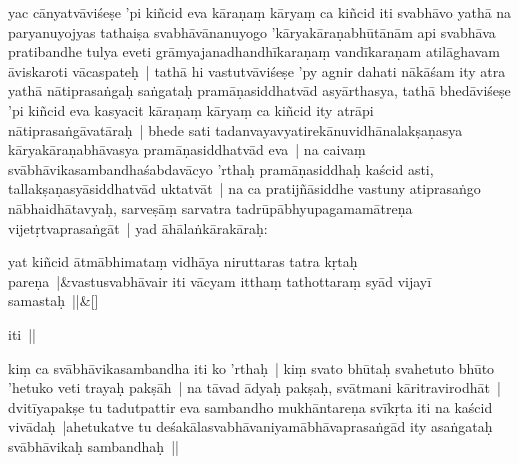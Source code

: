 \documentclass[article,12pt,a4paper]{memoir}%
\newcounter{parCount}
\begin{document}
	  \pstart \leavevmode%
	\label{thakur75-47.22}yac cānyatvāviśeṣe 'pi kiñcid eva kāraṇaṃ kāryaṃ ca kiñcid iti svabhāvo yathā na paryanuyojyas tathaiṣa svabhāvānanuyogo 'kāryakāraṇabhūtā\leavevmode{}nām api svabhāva pratibandhe tulya eveti grāmyajanadhandhīkaraṇaṃ \label{ratnakīrtinibandhāvali__36r1PF7IMVIAT61KSGR7T0A55I7}vandī\label{ratnakīrtinibandhāvali__36r1PF7IMVHGMKIKSCKKF1EMQRT}karaṇam atilāghavam āviskaroti vācaspateḥ | tathā hi vastutvāviśeṣe 'py agnir dahati nākāśam ity atra yathā nātiprasaṅgaḥ saṅgataḥ pramāṇasiddhatvād asyārthasya, tathā bhedāviśeṣe 'pi kiñcid eva kasyacit kāraṇaṃ kāryaṃ ca kiñcid ity atrāpi nātiprasaṅgāvatāraḥ | bhede sati tadanvayavyatirekānuvidhānalakṣaṇasya kāryakāraṇabhāvasya pramāṇasiddhatvād eva | na caivaṃ svābhāvikasambandhaśabdavācyo 'rthaḥ pramāṇasiddhaḥ kaścid asti, tallakṣaṇasyāsiddhatvād uktatvāt | na ca pratijñāsiddhe vastuny atiprasaṅgo nābhaidhātavyaḥ, sarveṣāṃ sarvatra tadrūpābhyupagamamātreṇa vijetṛtvaprasaṅgāt | yad āhālaṅkārakāraḥ:
	{}
	\pend%
      
	    
	    \stanza[\smallbreak]
	  yat kiñcid ātmābhimataṃ vidhāya niruttaras tatra kṛtaḥ pareṇa |&vastusvabhāvair iti vācyam itthaṃ tathottaraṃ syād vijayī samastaḥ ||\&[\smallbreak]
	  
	  
	  

	  \pstart \leavevmode%
	iti ||
	{}
	\pend%
      

	  \pstart \leavevmode%
	\label{thakur75-48.4}kiṃ ca svābhāvikasambandha iti ko 'rthaḥ | kiṃ svato bhūtaḥ svahetuto bhūto 'hetuko veti trayaḥ pakṣāh | na tāvad ādyaḥ pakṣaḥ, svātmani kāritravirodhāt | dvitīyapakṣe tu tadutpattir eva sambandho mukhāntareṇa svīkṛta iti na kaścid vivādaḥ |ahetukatve tu deśakālasvabhāvaniyamābhāvaprasaṅgād ity asaṅgataḥ svābhāvikaḥ sambandhaḥ ||
	{}
	\pend%
      
\end{document}
